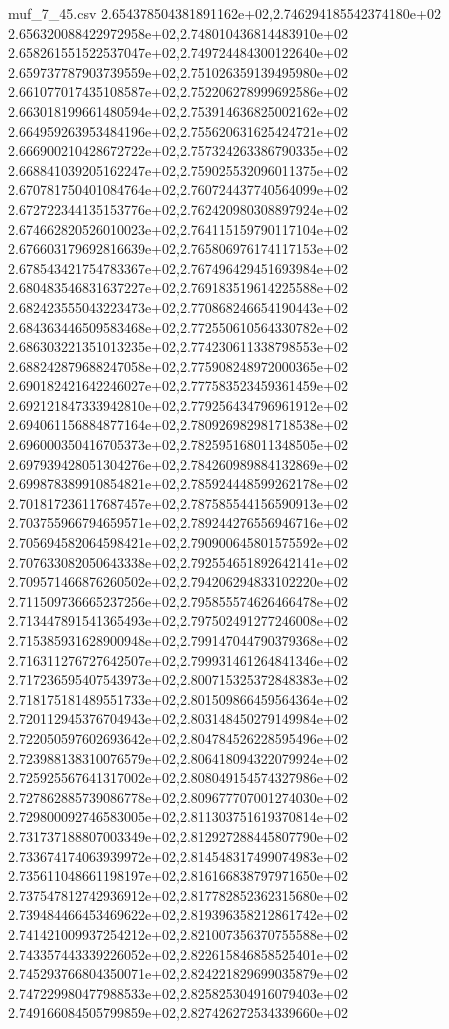 \begin{filecontents*}{muf_7_45.csv}
2.654378504381891162e+02,2.746294185542374180e+02
2.656320088422972958e+02,2.748010436814483910e+02
2.658261551522537047e+02,2.749724484300122640e+02
2.659737787903739559e+02,2.751026359139495980e+02
2.661077017435108587e+02,2.752206278999692586e+02
2.663018199661480594e+02,2.753914636825002162e+02
2.664959263953484196e+02,2.755620631625424721e+02
2.666900210428672722e+02,2.757324263386790335e+02
2.668841039205162247e+02,2.759025532096011375e+02
2.670781750401084764e+02,2.760724437740564099e+02
2.672722344135153776e+02,2.762420980308897924e+02
2.674662820526010023e+02,2.764115159790117104e+02
2.676603179692816639e+02,2.765806976174117153e+02
2.678543421754783367e+02,2.767496429451693984e+02
2.680483546831637227e+02,2.769183519614225588e+02
2.682423555043223473e+02,2.770868246654190443e+02
2.684363446509583468e+02,2.772550610564330782e+02
2.686303221351013235e+02,2.774230611338798553e+02
2.688242879688247058e+02,2.775908248972000365e+02
2.690182421642246027e+02,2.777583523459361459e+02
2.692121847333942810e+02,2.779256434796961912e+02
2.694061156884877164e+02,2.780926982981718538e+02
2.696000350416705373e+02,2.782595168011348505e+02
2.697939428051304276e+02,2.784260989884132869e+02
2.699878389910854821e+02,2.785924448599262178e+02
2.701817236117687457e+02,2.787585544156590913e+02
2.703755966794659571e+02,2.789244276556946716e+02
2.705694582064598421e+02,2.790900645801575592e+02
2.707633082050643338e+02,2.792554651892642141e+02
2.709571466876260502e+02,2.794206294833102220e+02
2.711509736665237256e+02,2.795855574626466478e+02
2.713447891541365493e+02,2.797502491277246008e+02
2.715385931628900948e+02,2.799147044790379368e+02
2.716311276727642507e+02,2.799931461264841346e+02
2.717236595407543973e+02,2.800715325372848383e+02
2.718175181489551733e+02,2.801509866459564364e+02
2.720112945376704943e+02,2.803148450279149984e+02
2.722050597602693642e+02,2.804784526228595496e+02
2.723988138310076579e+02,2.806418094322079924e+02
2.725925567641317002e+02,2.808049154574327986e+02
2.727862885739086778e+02,2.809677707001274030e+02
2.729800092746583005e+02,2.811303751619370814e+02
2.731737188807003349e+02,2.812927288445807790e+02
2.733674174063939972e+02,2.814548317499074983e+02
2.735611048661198197e+02,2.816166838797971650e+02
2.737547812742936912e+02,2.817782852362315680e+02
2.739484466453469622e+02,2.819396358212861742e+02
2.741421009937254212e+02,2.821007356370755588e+02
2.743357443339226052e+02,2.822615846858525401e+02
2.745293766804350071e+02,2.824221829699035879e+02
2.747229980477988533e+02,2.825825304916079403e+02
2.749166084505799859e+02,2.827426272534339660e+02

\end{filecontents*}
